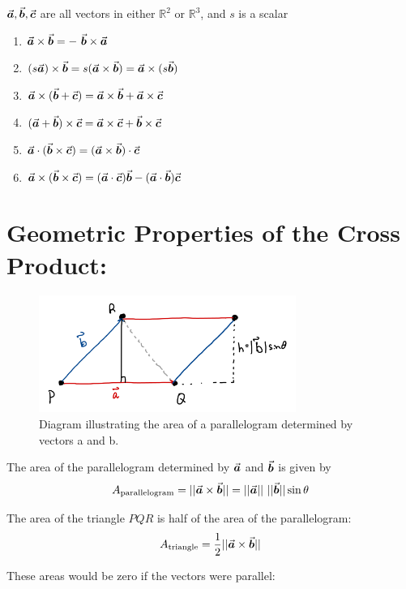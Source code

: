 \(\a, \b, \c\) are all vectors in either \(\mathbb{R}^2\) or \(\mathbb{R}^3\), and \(s\) is a scalar 
\begin{enumerate}
\item \(\a \times \b = -\ \b \times \a\)
\item \((s\a) \times \b =s(\a \times \b) = \a \times (s\b)\)
\item \(\a \times (\b +\c) = \a \times \b + \a \times \c\)
\item \((\a +\b) \times \c = \a \times \c + \b \times \c\)
\item \( \a \cdot (\b \times \c) = ( \a \times \b) \cdot \c\)
\item \( \a \times (\b \times \c) = ( \a \cdot \c) \b - (\a  \cdot \b) \c\)
\end{enumerate}

\vspace*{.1in}

\section*{Geometric Properties of the Cross Product:}





\begin{figure}[!h]
\centering
\includegraphics[height=1.5in]{Ch2s4-area-parallelogram.png}
\caption{Diagram illustrating the area of a parallelogram determined by vectors a and b.}
\end{figure}

\hspace*{.2in}

 The area of the parallelogram determined by \(\a\) and \(\b\) is given by
 \[A_{\text{parallelogram}} =||\a \times \b|| =||\a||\ ||\b|| \sin\theta\]

The area of the triangle \(PQR\) is half of the area of the parallelogram:
 \[A_{\text{triangle}} = \frac{1}{2}||\a \times \b||\]
 
 These areas would be zero if the vectors were parallel:\\

